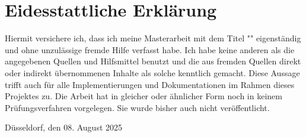 \section*{Eidesstattliche Erklärung}
\begin{spacing}{1.5}
Hiermit versichere ich, dass ich meine Masterarbeit mit dem Titel "\titelname" eigenständig und ohne unzulässige fremde Hilfe verfasst habe. Ich habe keine anderen als die angegebenen Quellen und Hilfsmittel benutzt und die aus fremden Quellen direkt oder indirekt übernommenen Inhalte als solche kenntlich gemacht. Diese Aussage trifft auch für alle Implementierungen und Dokumentationen im Rahmen dieses Projektes zu. Die Arbeit hat in gleicher oder ähnlicher Form noch in keinem Prüfungsverfahren vorgelegen. Sie wurde bisher auch nicht veröffentlicht.
\vspace{3cm}

\noindent\textbf{\authorname}

\noindent Düsseldorf, den 08. August 2025
\end{spacing}
